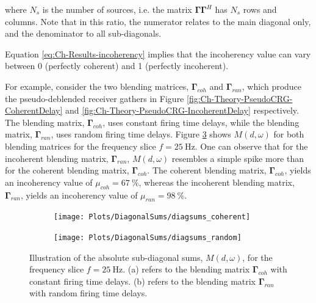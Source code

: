 where $N_s$ is the number of sources, i.e. the matrix $\mathbf{\Gamma \Gamma}^H$ has $N_s$ rows and columns. Note that in this ratio, the numerator relates to the main diagonal only, and the denominator to all sub-diagonals.

Equation \ref{eq:Ch-Results-incoherency} implies that the incoherency value can vary between 0 (perfectly coherent) and 1 (perfectly incoherent).

For example, consider the two blending matrices, $\mathbf{\Gamma}_{coh}$ and $\mathbf{\Gamma}_{ran}$, which produce the pseudo-deblended receiver gathers in Figure \ref{fig:Ch-Theory-PseudoCRG-CoherentDelay} and \ref{fig:Ch-Theory-PseudoCRG-IncoherentDelay} respectively. The blending matrix, $\mathbf{\Gamma}_{coh}$, uses constant firing time delays, while the blending matrix, $\mathbf{\Gamma}_{ran}$, uses random firing time delays. Figure \ref{fig:Ch-Incoherency-Coh-vs-Ran-Diag} shows $M(d,\omega)$ for both blending matrices for the frequency slice $f=\SI{25}{\hertz}$. One can observe that for the incoherent blending matrix, $\mathbf{\Gamma}_{ran}$, $M(d,\omega)$ resembles a simple spike more than for the coherent blending matrix, $\mathbf{\Gamma}_{coh}$. The coherent blending matrix, $\mathbf{\Gamma}_{coh}$,  yields an incoherency value of $\mu_{coh} = \SI{67}{\percent}$, whereas the incoherent blending matrix, $\mathbf{\Gamma}_{ran}$, yields an incoherency value of $\mu_{ran} = \SI{98}{\percent}$.

\begin{figure}
	
	\centering
	\begin{subfigure}[b]{0.45\textwidth}
	\centering
	\texttt{[image: Plots/DiagonalSums/diagsums\_coherent]}	
	\caption{}
	\label{fig:Ch-Incoherency-CoherentDiag}	
	\end{subfigure}
	\centering
	\begin{subfigure}[b]{0.45\textwidth}
	\centering
	\texttt{[image: Plots/DiagonalSums/diagsums\_random]}	
	\caption{}
	\label{fig:Ch-Incoherency-RandomDiag}	
	\end{subfigure}
	
	\caption{Illustration of the absolute sub-diagonal sums, $M(d,\omega)$, for the frequency slice $f=\SI{25}{\hertz}$. (a) refers to the blending matrix $\mathbf{\Gamma}_{coh}$ with constant firing time delays.  (b) refers to the blending matrix $\mathbf{\Gamma}_{ran}$ with random firing time delays.}
	\label{fig:Ch-Incoherency-Coh-vs-Ran-Diag}
	
\end{figure}


